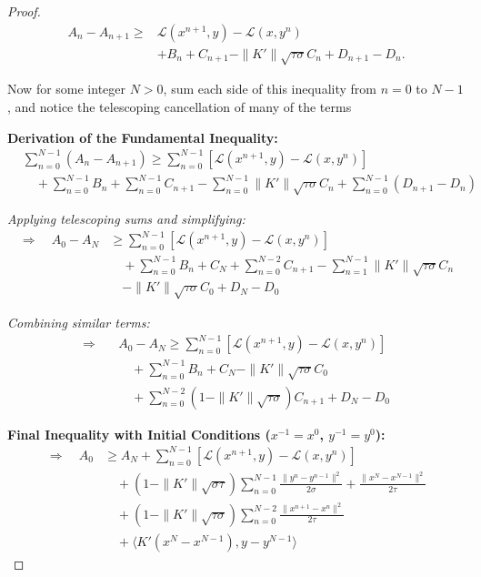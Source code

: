 \documentclass[10pt,a4paper]{amsart}
\begin{document}
\begin{proof}
\[
\begin{aligned}
    A_n -A_{n+1}  \geq& \mathcal{L}(x^{n+1},y)- \mathcal{L}(x,y^n)\\ & +B_n +C_{n+1}-\|K'\|\sqrt{\tau\sigma}C_n + D_{n+1}-D_n.
\end{aligned}
\]


Now for some integer $N>0$, sum each side of this inequality from $n=0$ to $N-1$, and notice the telescoping cancellation of many of the terms

\noindent\textbf{Derivation of the Fundamental Inequality:}
\begin{align*}
&\sum_{n=0}^{N-1}(A_n - A_{n+1}) \ge 
\sum_{n=0}^{N-1} \left[ \mathcal{L}(x^{n+1},y)- \mathcal{L}(x,y^n) \right] \\
&\quad + \sum_{n=0}^{N-1} B_n + \sum_{n=0}^{N-1} C_{n+1} - \sum_{n=0}^{N-1} \|K'\|\sqrt{\tau\sigma}  C_n + \sum_{n=0}^{N-1} (D_{n+1} - D_n)
\end{align*}

\noindent\textit{Applying telescoping sums and simplifying:}
\begin{align*}
\Rightarrow\quad
A_0 - A_N &\ge 
\sum_{n=0}^{N-1} \left[ \mathcal{L}(x^{n+1},y)- \mathcal{L}(x,y^n) \right] \\
&\quad + \sum_{n=0}^{N-1} B_n + C_N + \sum_{n=0}^{N-2} C_{n+1} - \sum_{n=1}^{N-1} \|K'\|\sqrt{\tau\sigma}  C_n \\
&\quad - \|K'\|\sqrt{\tau\sigma}  C_0 + D_N - D_0
\end{align*}

\noindent\textit{Combining similar terms:}
\begin{align*}
\Rightarrow\quad
&A_0 - A_N \ge 
\sum_{n=0}^{N-1} \left[ \mathcal{L}(x^{n+1},y)- \mathcal{L}(x,y^n) \right] \\
&\quad + \sum_{n=0}^{N-1} B_n + C_N - \|K'\|\sqrt{\tau\sigma}  C_0 \\
&\quad + \sum_{n=0}^{N-2} (1 - \|K'\|\sqrt{\tau\sigma})  C_{n+1} + D_N - D_0
\end{align*}

\noindent\textbf{Final Inequality with Initial Conditions ($x^{-1} = x^0$, $y^{-1} = y^0$):}
\begin{align*}
\Rightarrow\quad
A_0 &\ge A_N +
\sum_{n=0}^{N-1} \left[ \mathcal{L}(x^{n+1},y)- \mathcal{L}(x,y^n) \right] \\
&\quad + (1 - \|K'\|\sqrt{\sigma\tau}) \sum_{n=0}^{N-1} \frac{\|y^n - y^{n-1}\|^2}{2\sigma} + \frac{\|x^N - x^{N-1}\|^2}{2\tau} \\
&\quad + (1 - \|K'\|\sqrt{\tau\sigma}) \sum_{n=0}^{N-2} \frac{\|x^{n+1} - x^n\|^2}{2\tau} \\
&\quad + \langle K'(x^N - x^{N-1}), y - y^{N-1} \rangle
\end{align*}


\end{proof}
\end{document}
